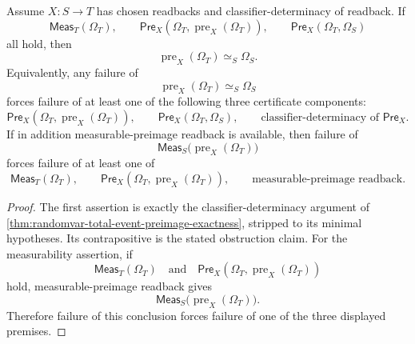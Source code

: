 \begin{theorem}
\label{thm:randomvar-minimal-obstruction-total-event-exactness}
Assume $X:S\to T$ has chosen readbacks and classifier-determinacy of readback. If
$$
\mathsf{Meas}_T(\Omega_T),\qquad
\mathsf{Pre}_X(\Omega_T,\operatorname{pre}_X(\Omega_T)),\qquad
\mathsf{Pre}_X(\Omega_T,\Omega_S)
$$
all hold, then
$$
\operatorname{pre}_X(\Omega_T)\simeq_S\Omega_S.
$$
Equivalently, any failure of
$$
\operatorname{pre}_X(\Omega_T)\simeq_S\Omega_S
$$
forces failure of at least one of the following three certificate components:
$$
\mathsf{Pre}_X(\Omega_T,\operatorname{pre}_X(\Omega_T)),\qquad
\mathsf{Pre}_X(\Omega_T,\Omega_S),\qquad
\text{classifier-determinacy of }\mathsf{Pre}_X.
$$
If in addition measurable-preimage readback is available, then failure of
$$
\mathsf{Meas}_S\bigl(\operatorname{pre}_X(\Omega_T)\bigr)
$$
forces failure of at least one of
$$
\mathsf{Meas}_T(\Omega_T),\qquad
\mathsf{Pre}_X(\Omega_T,\operatorname{pre}_X(\Omega_T)),\qquad
\text{measurable-preimage readback}.
$$
\end{theorem}
\begin{proof}
The first assertion is exactly the classifier-determinacy argument of \autoref{thm:randomvar-total-event-preimage-exactness}, stripped to its minimal hypotheses. Its contrapositive is the stated obstruction claim.
For the measurability assertion, if
$$
\mathsf{Meas}_T(\Omega_T)
\quad\text{and}\quad
\mathsf{Pre}_X(\Omega_T,\operatorname{pre}_X(\Omega_T))
$$
hold, measurable-preimage readback gives
$$
\mathsf{Meas}_S\bigl(\operatorname{pre}_X(\Omega_T)\bigr).
$$
Therefore failure of this conclusion forces failure of one of the three displayed premises.
\end{proof}

